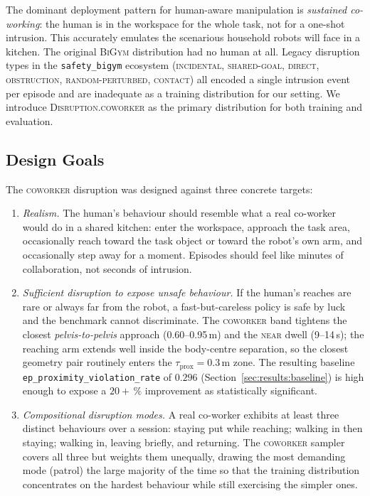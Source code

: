 \documentclass[11pt,a4paper]{report}
\newcommand{\bigym}{\textsc{BiGym}}
\newcommand{\sbigym}{\texttt{safety\_bigym}}
\newcommand{\coworker}{\textsc{coworker}}
\begin{document}
The dominant deployment pattern for human-aware manipulation is
\emph{sustained co-working}: the human is in the workspace for the
whole task, not for a one-shot intrusion. This accurately emulates the scenarious household robots will face in a kitchen. The original \bigym{}
distribution had no human at all. Legacy disruption types in the
\sbigym{} ecosystem (\textsc{incidental}, \textsc{shared-goal},
\textsc{direct}, \textsc{obstruction}, \textsc{random-perturbed},
\textsc{contact}) all encoded a single intrusion event per episode
and are inadequate as a training distribution for our setting. We
introduce \textsc{Disruption.coworker} as the primary distribution
for both training and evaluation.

\subsection{Design Goals}
\label{sec:bench:coworker:design}

The \coworker{} disruption was designed against three concrete
targets:

\begin{enumerate}[topsep=2pt,itemsep=2pt]
\item \emph{Realism.} The human's behaviour should resemble what a
  real co-worker would do in a shared kitchen: enter the workspace,
  approach the task area, occasionally reach toward the task object
  or toward the robot's own arm, and occasionally step
  away for a moment. Episodes should feel like minutes of
  collaboration, not seconds of intrusion.
\item \emph{Sufficient disruption to expose unsafe behaviour.} If
  the human's reaches are rare or always far from the robot, a
  fast-but-careless policy is safe by luck and the benchmark cannot
  discriminate. The \coworker{} band tightens the closest
  \emph{pelvis-to-pelvis} approach (0.60--0.95\,m) and the
  \textsc{near} dwell (9--14\,s); the reaching arm extends well
  inside the body-centre separation, so the closest geometry pair
  routinely enters the $\tau_{\mathrm{prox}} = 0.3$\,m zone. The
  resulting baseline
  \texttt{ep\_proximity\_violation\_rate} of $0.296$
  (Section~\ref{sec:results:baseline}) is high enough to expose a
  $20+\,\%$ improvement as statistically significant.
\item \emph{Compositional disruption modes.} A real co-worker
  exhibits at least three distinct behaviours over a session:
  staying put while reaching; walking in then staying; walking in,
  leaving briefly, and returning. The \coworker{} sampler covers all
  three but weights them unequally, drawing the most demanding mode
  (patrol) the large majority of the time so that the training
  distribution concentrates on the hardest behaviour while still
  exercising the simpler ones.
\end{enumerate}
\end{document}

